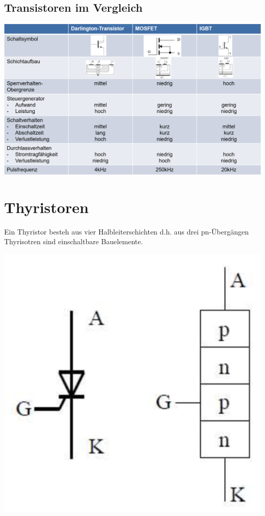 \subsection{Transistoren im Vergleich}
\includegraphics[width=\linewidth]{images/transdiff}
%    
%    
\begin{minipage}{0.7\linewidth}
\section{Thyristoren}
Ein Thyristor besteh aus vier Halbleiterschichten d.h. aus drei pn-Übergängen\newline
Thyrisotren sind einschaltbare Bauelemente.
\end{minipage}
\begin{minipage}{0.3\linewidth}
     \includegraphics[width=0.5\linewidth]{images/thyraufbau}
\end{minipage}
